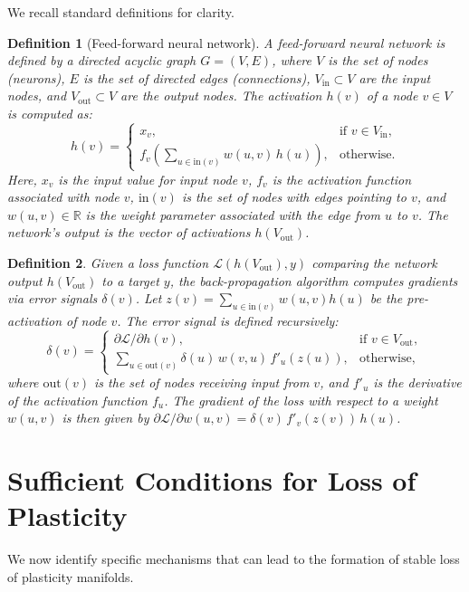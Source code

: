 \documentclass{article}
\newcommand{\Loss}{\mathcal{L}}
\newcommand{\R}{\mathbb{R}}
\newtheorem{definition}{Definition}[section]
\begin{document}
We recall standard definitions for clarity.

\begin{definition}[Feed-forward neural network]
A feed-forward neural network is defined by a directed acyclic graph $G=(V,E)$, where $V$ is the set of nodes (neurons), $E$ is the set of directed edges (connections), $V_{\text{in}} \subset V$ are the input nodes, and $V_{\text{out}} \subset V$ are the output nodes. The activation $h(v)$ of a node $v \in V$ is computed as:
\[
h(v)=
\begin{cases}
x_v, & \text{if } v\in V_{\text{in}},\\
f_v\!\left(\sum_{u\!\in\!\mathrm{in}(v)}w(u,v)\,h(u)\right), &\text{otherwise}.
\end{cases}
\]
Here, $x_v$ is the input value for input node $v$, $f_v$ is the activation function associated with node $v$, $\mathrm{in}(v)$ is the set of nodes with edges pointing to $v$, and $w(u,v) \in \R$ is the weight parameter associated with the edge from $u$ to $v$. The network's output is the vector of activations $h(V_{\text{out}})$.
\end{definition}

\begin{definition}
Given a loss function $\Loss(h(V_{\text{out}}),y)$ comparing the network output $h(V_{\text{out}})$ to a target $y$, the back-propagation algorithm computes gradients via error signals $\delta(v)$. Let $z(v) = \sum_{u\in\mathrm{in}(v)}w(u,v)h(u)$ be the pre-activation of node $v$. The error signal is defined recursively:
\[
\delta(v)=
\begin{cases}
\partial\Loss/\partial h(v), & \text{if } v\in V_{\text{out}},\\[4pt]
\displaystyle\sum_{u\in\mathrm{out}(v)}\delta(u)\,w(v,u)\,f'_u(z(u)), &\text{otherwise},
\end{cases}
\]
where $\mathrm{out}(v)$ is the set of nodes receiving input from $v$, and $f'_u$ is the derivative of the activation function $f_u$. The gradient of the loss with respect to a weight $w(u,v)$ is then given by $\partial\Loss/\partial w(u,v)=\delta(v)\,f'_v(z(v))\,h(u)$.\qedhere
\end{definition}

\section{Sufficient Conditions for Loss of Plasticity}
\label{sec:frozen}

We now identify specific mechanisms that can lead to the formation of stable loss of plasticity manifolds.
\end{document}
